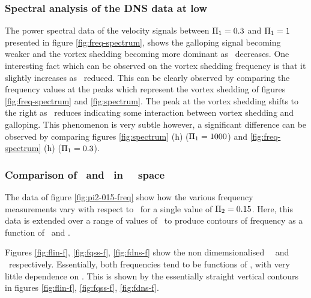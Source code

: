 \subsubsection{Spectral analysis of the DNS data at low \massstiff}
\label{subsec:freq-spectrum}



The power spectral data of the velocity signals between $\Pi_1=0.3$ and $\Pi_1=1$ presented in figure \ref{fig:freq-spectrum}, shows the galloping signal becoming weaker and the vortex shedding becoming more dominant as \massstiff\ decreases. One interesting fact which can be observed on the vortex shedding frequency is that it slightly increases as \massstiff\ reduced. This can be clearly observed by comparing the frequency values at the peaks which represent the vortex shedding of figures \ref{fig:freq-spectrum} and \ref{fig:spectrum}. The peak at the vortex shedding shifts to the right as \massstiff\ reduces indicating some interaction between vortex shedding and galloping. This phenomenon is very subtle however, a significant difference can be observed by comparing figures \ref{fig:spectrum} (h) ($\Pi_1=1000$) and  \ref{fig:freq-spectrum} (h) ($\Pi_1=0.3$).


\subsubsection{Comparison of \freqlin\ and \freqqss\ in \massstiff\ \massdamp\ space}

The data of figure \ref{fig:pi2-015-freq} show how the various frequency measurements vary with respect to \massstiff\ for a single value of $\Pi_2 = 0.15$. Here, this data is extended over a range of values of \massdamp\ to produce contours of frequency as a function of \massstiff\ and \massdamp.








Figures \ref{fig:flin-f}, \ref{fig:fqss-f},  \ref{fig:fdns-f} show the non dimemsionalised \freqlin\, \freqqss\ and \freqdns\ respectively. Essentially, both frequencies tend to be functions of \massstiff, with very little dependence on \massdamp. This is shown by the essentially straight vertical contours in figures \ref{fig:flin-f}, \ref{fig:fqss-f},  \ref{fig:fdns-f}.

